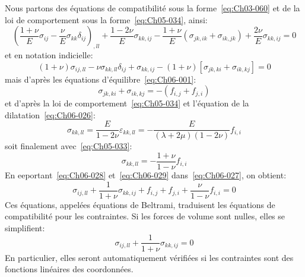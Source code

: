 Nous partons des équations de compatibilité sous la forme~\eqref{eq:Ch03-060} et de la loi de comportement sous la forme~\eqref{eq:Ch05-034}, ainsi:
\begin{equation*}
    \left( \frac{1+\nu}{E} \sigma_{ij} - \frac{\nu}{E} \sigma_{kk} \delta_{ij} \right)_{,ll} + \frac{1 - 2\nu}{E} \sigma_{kk,ij} - \frac{1+ \nu}{E} \left( \sigma_{jk,ik} + \sigma_{ik,jk} \right) + \frac{2\nu}{E} \sigma_{kk,ij} = 0
\end{equation*}
et en notation indicielle:
\begin{equation}
    \left( 1+\nu \right)\sigma_{ij,ll} - \nu \sigma_{kk,ll} \delta_{ij} + \sigma_{kk,ij} - \left( 1+\nu \right) \left[ \sigma_{jk,ki} + \sigma_{ik,kj} \right] = 0
    \label{eq:Ch06-027}
\end{equation}
mais d'après les équations d'équilibre~\eqref{eq:Ch06-001}:
\begin{equation}
    \sigma_{jk,ki} + \sigma_{ik,kj} = - \left( f_{i,j} + f_{j,i} \right)
    \label{eq:Ch06-028}
\end{equation}
et d'après la loi de comportement~\eqref{eq:Ch05-034} et l'équation de la dilatation~\eqref{eq:Ch06-026}:
\begin{equation*}
    \sigma_{kk,ll} = \frac{E}{1-2\nu} \varepsilon_{kk,ll} = - \frac{E}{\left( \lambda + 2\mu \right)\left( 1-2\nu \right)}f_{i,i}
\end{equation*}
soit finalement avec~\eqref{eq:Ch05-033}:
\begin{equation}
    \sigma_{kk,ll} = - \frac{1+\nu}{1-\nu} f_{i,i}
    \label{eq:Ch06-029}
\end{equation}
En eeportant~\eqref{eq:Ch06-028} et~\eqref{eq:Ch06-029} dans~\eqref{eq:Ch06-027}, on obtient:
\begin{equation}
    \sigma_{ij,ll} + \frac{1}{1+\nu} \sigma_{kk,ij} + f_{i,j} + f_{j,i} + \frac{\nu}{1-\nu} f_{i,i} = 0
    \label{eq:Ch06-030}
\end{equation}
Ces équations, appelées équations de Beltrami, traduisent les équations de compatibilité pour les contraintes.
Si les forces de volume sont nulles, elles se simplifient:
\begin{equation}
    \sigma_{ij,ll} + \frac{1}{1+\nu} \sigma_{kk,ij} = 0
    \label{eq:Ch06-031}
\end{equation}
En particulier, elles seront automatiquement vérifiées si les contraintes sont des fonctions linéaires des coordonnées.


